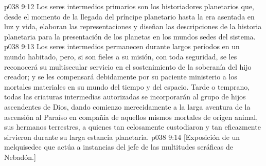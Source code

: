 \vs p038 9:12 Los seres intermedios primarios son los historiadores planetarios que, desde el momento de la llegada del príncipe planetario hasta la era asentada en luz y vida, elaboran las representaciones y diseñan las descripciones de la historia planetaria para la presentación de los planetas en los mundos sedes del sistema.
\vs p038 9:13 \pc Los seres intermedios permanecen durante largos períodos en un mundo habitado, pero, si son fieles a su misión, con toda seguridad, se les reconocerá su multisecular servicio en el sostenimiento de la soberanía del hijo creador; y se les compensará debidamente por su paciente ministerio a los mortales materiales en su mundo del tiempo y del espacio. Tarde o temprano, todas las criaturas intermedias autorizadas se incorporarán al grupo de hijos ascendentes de Dios, dando comienzo merecidamente a la larga aventura de la ascensión al Paraíso en compañía de aquellos mismos mortales de origen animal, sus hermanos terrestres, a quienes tan celosamente custodiaron y tan eficazmente sirvieron durante su larga estancia planetaria.
\vsetoff
\vs p038 9:14 [Exposición de un melquisedec que actúa a instancias del jefe de las multitudes seráficas de Nebadón.]
